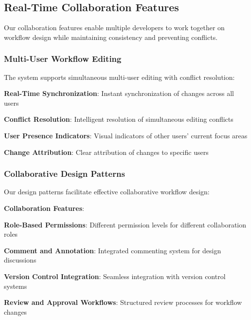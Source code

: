 \subsection*{Real-Time Collaboration Features}

Our collaboration features enable multiple developers to work together on workflow design while maintaining consistency and preventing conflicts.

\subsubsection*{Multi-User Workflow Editing}

The system supports simultaneous multi-user editing with conflict resolution:

\begin{compactlist}
    \item \textbf{Real-Time Synchronization}: Instant synchronization of changes across all users
    \item \textbf{Conflict Resolution}: Intelligent resolution of simultaneous editing conflicts
    \item \textbf{User Presence Indicators}: Visual indicators of other users' current focus areas
    \item \textbf{Change Attribution}: Clear attribution of changes to specific users
\end{compactlist}

\subsubsection*{Collaborative Design Patterns}

Our design patterns facilitate effective collaborative workflow design:

\begin{alertbox}
\textbf{Collaboration Features}:
\begin{compactlist}
    \item \textbf{Role-Based Permissions}: Different permission levels for different collaboration roles
    \item \textbf{Comment and Annotation}: Integrated commenting system for design discussions
    \item \textbf{Version Control Integration}: Seamless integration with version control systems
    \item \textbf{Review and Approval Workflows}: Structured review processes for workflow changes
\end{compactlist}
\end{alertbox}

